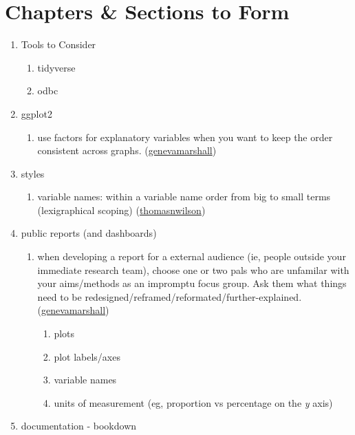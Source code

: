\documentclass[
]{book}
\providecommand{\tightlist}{%
  \setlength{\itemsep}{0pt}\setlength{\parskip}{0pt}}
\begin{document}
\hypertarget{chapters-sections-to-form}{%
\section{Chapters \& Sections to Form}\label{chapters-sections-to-form}}

\begin{enumerate}
\def\labelenumi{\arabic{enumi}.}
\tightlist
\item
  Tools to Consider

  \begin{enumerate}
  \def\labelenumii{\arabic{enumii}.}
  \tightlist
  \item
    tidyverse
  \item
    odbc
  \end{enumerate}
\item
  ggplot2

  \begin{enumerate}
  \def\labelenumii{\arabic{enumii}.}
  \tightlist
  \item
    use factors for explanatory variables when you want to keep the order consistent across graphs. (\href{https://github.com/genevamarshall}{genevamarshall})
  \end{enumerate}
\item
  styles

  \begin{enumerate}
  \def\labelenumii{\arabic{enumii}.}
  \tightlist
  \item
    variable names: within a variable name order from big to small terms (lexigraphical scoping) (\href{https://github.com/thomasnwilson}{thomasnwilson})
  \end{enumerate}
\item
  public reports (and dashboards)

  \begin{enumerate}
  \def\labelenumii{\arabic{enumii}.}
  \tightlist
  \item
    when developing a report for a external audience (ie, people outside your immediate research team), choose one or two pals who are unfamilar with your aims/methods as an impromptu focus group. Ask them what things need to be redesigned/reframed/reformated/further-explained. (\href{https://github.com/genevamarshall}{genevamarshall})

    \begin{enumerate}
    \def\labelenumiii{\arabic{enumiii}.}
    \tightlist
    \item
      plots
    \item
      plot labels/axes
    \item
      variable names
    \item
      units of measurement (eg, proportion vs percentage on the \emph{y} axis)
    \end{enumerate}
  \end{enumerate}
\item
  documentation - bookdown
\end{enumerate}
\end{document}
